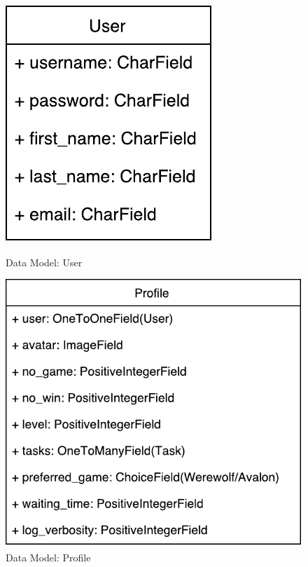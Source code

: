 \documentclass[11pt]{article}
\begin{document}
\begin{figure}
\centering
\begin{minipage}{.5\linewidth}
\centering
\includegraphics[width=0.7\linewidth, keepaspectratio]{model-user.pdf}
\caption{Data Model: User}
\label{fig:model-user}
\end{minipage}%
\begin{minipage}{.5\linewidth}
\centering
\includegraphics[width=0.9\linewidth, keepaspectratio]{model-profile.pdf}
\caption{Data Model: Profile}
\label{fig:model-profile}
\end{minipage}
\end{figure}
\end{document}
